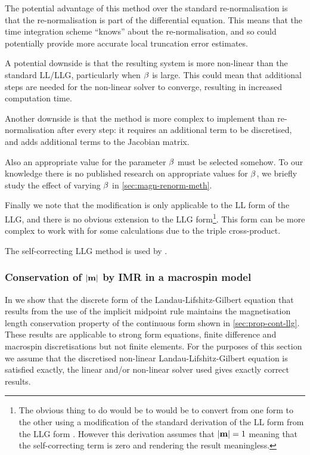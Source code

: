 The potential advantage of this method over the standard re-normalisation is that the re-normalisation is part of the differential equation.
This means that the time integration scheme ``knows'' about the re-normalisation, and so could potentially provide more accurate local truncation error estimates.

A potential downside is that the resulting system is more non-linear than the standard LL/LLG, particularly when $\beta$ is large.
This could mean that additional steps are needed for the non-linear solver to converge, resulting in increased computation time.

Another downside is that the method is more complex to implement than re-normalisation after every step: it requires an additional term to be discretised, and adds additional terms to the Jacobian matrix.

Also an appropriate value for the parameter $\beta$ must be selected somehow.
To our knowledge there is no published research on appropriate values for $\beta$, we briefly study the effect of varying $\beta$ in \cref{sec:magn-renorm-meth}.

Finally we note that the modification is only applicable to the LL form of the LLG, and there is no obvious extension to the LLG form\footnote{The obvious thing to do would be to would be to convert from one form to the other using a modification of the standard derivation of the LL form from the LLG form \cite{Aharoni1996}.
However this derivation assumes that $\left|{\boldsymbol{\mathrm{m}}} \right| = 1$ meaning that the self-correcting term is zero and rendering the result meaningless.}.
This form can be more complex to work with for some calculations due to the triple cross-product.

The self-correcting LLG method is used by \nmag \cite{fangor-donahue-email} \cite{Fischbacher2009}.


\subsubsection{Conservation of $\left|{\boldsymbol{\mathrm{m}}} \right|$ by IMR in a macrospin model}
\label{sec:proof-magn-length-ode-imr-llg}

In  we show that the discrete form of the Landau-Lifshitz-Gilbert equation that results from the use of the implicit midpoint rule maintains the magnetisation length conservation property of the continuous form shown in \cref{sec:prop-cont-llg}.
These results are applicable to strong form equations, \ie finite difference and macrospin discretisations but not finite elements.
For the purposes of this section we assume that the discretised non-linear Landau-Lifshitz-Gilbert equation is satisfied exactly, \ie the linear and/or non-linear solver used gives exactly correct results.

